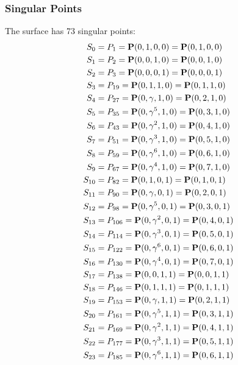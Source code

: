 \documentclass{article}
\newcommand{\bP}{{\bf P}}
\begin{document}
{\subsubsection*{Singular Points}
The surface has 73 singular points:\\
\begin{align*}
S_{0} &= P_{1}=\bP(0, 1, 0, 0) = \bP(0, 1, 0, 0)\\
S_{1} &= P_{2}=\bP(0, 0, 1, 0) = \bP(0, 0, 1, 0)\\
S_{2} &= P_{3}=\bP(0, 0, 0, 1) = \bP(0, 0, 0, 1)\\
S_{3} &= P_{19}=\bP(0, 1, 1, 0) = \bP(0, 1, 1, 0)\\
S_{4} &= P_{27}=\bP(0, \gamma , 1, 0) = \bP(0, 2, 1, 0)\\
S_{5} &= P_{35}=\bP(0, \gamma^{5}, 1, 0) = \bP(0, 3, 1, 0)\\
S_{6} &= P_{43}=\bP(0, \gamma^{2}, 1, 0) = \bP(0, 4, 1, 0)\\
S_{7} &= P_{51}=\bP(0, \gamma^{3}, 1, 0) = \bP(0, 5, 1, 0)\\
S_{8} &= P_{59}=\bP(0, \gamma^{6}, 1, 0) = \bP(0, 6, 1, 0)\\
S_{9} &= P_{67}=\bP(0, \gamma^{4}, 1, 0) = \bP(0, 7, 1, 0)\\
S_{10} &= P_{82}=\bP(0, 1, 0, 1) = \bP(0, 1, 0, 1)\\
S_{11} &= P_{90}=\bP(0, \gamma , 0, 1) = \bP(0, 2, 0, 1)\\
S_{12} &= P_{98}=\bP(0, \gamma^{5}, 0, 1) = \bP(0, 3, 0, 1)\\
S_{13} &= P_{106}=\bP(0, \gamma^{2}, 0, 1) = \bP(0, 4, 0, 1)\\
S_{14} &= P_{114}=\bP(0, \gamma^{3}, 0, 1) = \bP(0, 5, 0, 1)\\
S_{15} &= P_{122}=\bP(0, \gamma^{6}, 0, 1) = \bP(0, 6, 0, 1)\\
S_{16} &= P_{130}=\bP(0, \gamma^{4}, 0, 1) = \bP(0, 7, 0, 1)\\
S_{17} &= P_{138}=\bP(0, 0, 1, 1) = \bP(0, 0, 1, 1)\\
S_{18} &= P_{146}=\bP(0, 1, 1, 1) = \bP(0, 1, 1, 1)\\
S_{19} &= P_{153}=\bP(0, \gamma , 1, 1) = \bP(0, 2, 1, 1)\\
S_{20} &= P_{161}=\bP(0, \gamma^{5}, 1, 1) = \bP(0, 3, 1, 1)\\
S_{21} &= P_{169}=\bP(0, \gamma^{2}, 1, 1) = \bP(0, 4, 1, 1)\\
S_{22} &= P_{177}=\bP(0, \gamma^{3}, 1, 1) = \bP(0, 5, 1, 1)\\
S_{23} &= P_{185}=\bP(0, \gamma^{6}, 1, 1) = \bP(0, 6, 1, 1)\\

\end{align*}}
\end{document}
